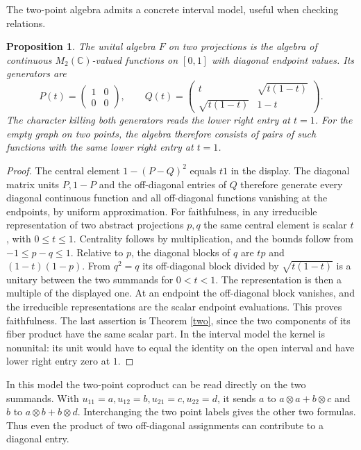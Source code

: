 \documentclass[11pt,a4paper]{article}
\newtheorem{prop}[thm]{Proposition}
\begin{document}
The two-point algebra admits a concrete interval model, useful when checking relations.

\begin{prop}
The unital algebra $F$ on two projections is the algebra of continuous $M_2(\mathbb C)$-valued functions on $[0,1]$ with diagonal endpoint values. Its generators are
\[
 P(t)=\begin{pmatrix}1&0\\0&0\end{pmatrix},\qquad
 Q(t)=\begin{pmatrix}t&\sqrt{t(1-t)}\\\sqrt{t(1-t)}&1-t\end{pmatrix}.
\]
The character killing both generators reads the lower right entry at $t=1$. For the empty graph on two points, the algebra therefore consists of pairs of such functions with the same lower right entry at $t=1$.
\end{prop}
\begin{proof}
The central element $1-(P-Q)^2$ equals $t1$ in the display. The diagonal matrix units $P,1-P$ and the off-diagonal entries of $Q$ therefore generate every diagonal continuous function and all off-diagonal functions vanishing at the endpoints, by uniform approximation. For faithfulness, in any irreducible representation of two abstract projections $p,q$ the same central element is scalar $t$, with $0\leq t\leq1$. Centrality follows by multiplication, and the bounds follow from $-1\leq p-q\leq1$. Relative to $p$, the diagonal blocks of $q$ are $tp$ and $(1-t)(1-p)$. From $q^2=q$ its off-diagonal block divided by $\sqrt{t(1-t)}$ is a unitary between the two summands for $0<t<1$. The representation is then a multiple of the displayed one. At an endpoint the off-diagonal block vanishes, and the irreducible representations are the scalar endpoint evaluations. This proves faithfulness. The last assertion is Theorem \ref{two}, since the two components of its fiber product have the same scalar part. In the interval model the kernel is nonunital: its unit would have to equal the identity on the open interval and have lower right entry zero at $1$.
\end{proof}

In this model the two-point coproduct can be read directly on the two summands. With $u_{11}=a,u_{12}=b,u_{21}=c,u_{22}=d$, it sends $a$ to $a\otimes a+b\otimes c$ and $b$ to $a\otimes b+b\otimes d$. Interchanging the two point labels gives the other two formulas. Thus even the product of two off-diagonal assignments can contribute to a diagonal entry.
\end{document}
